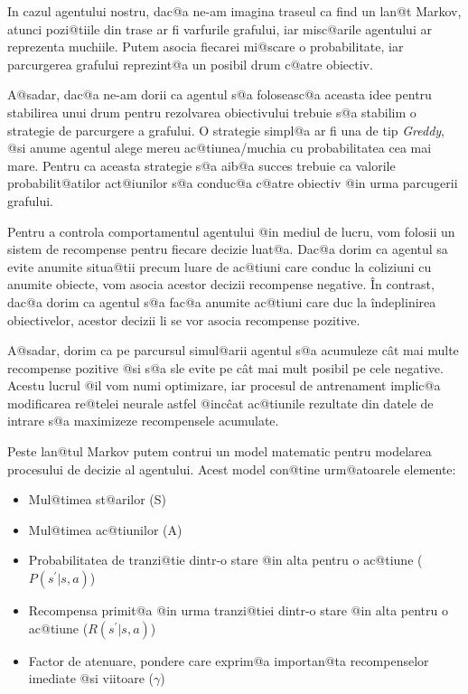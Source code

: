 In cazul agentului nostru, dac@a ne-am imagina traseul ca find un lan@t Markov, atunci pozi@tiile din trase ar fi varfurile grafului, iar misc@arile agentului ar reprezenta muchiile. Putem asocia fiecarei mi@scare o probabilitate, iar parcurgerea grafului reprezint@a un posibil drum c@atre obiectiv.

A@sadar, dac@a ne-am dorii ca agentul s@a foloseasc@a aceasta idee pentru stabilirea unui drum pentru rezolvarea obiectivului trebuie s@a stabilim o strategie de parcurgere a grafului.
O strategie simpl@a ar fi una de tip {\sl Greddy}, @si anume agentul alege mereu ac@tiunea/muchia cu probabilitatea cea mai mare. Pentru ca aceasta strategie s@a aib@a succes trebuie ca valorile probabilit@atilor act@iunilor s@a conduc@a c@atre obiectiv @in urma parcugerii grafului.

Pentru a controla comportamentul agentului @in mediul de lucru, vom folosii un sistem de recompense pentru fiecare decizie luat@a. Dac@a dorim ca agentul sa evite anumite situa@tii precum luare de ac@tiuni care conduc la coliziuni cu anumite obiecte, vom asocia acestor decizii recompense negative. \^In contrast, dac@a dorim ca agentul s@a fac@a anumite ac@tiuni care duc la \^indeplinirea obiectivelor, acestor decizii li se vor asocia recompense pozitive.

A@sadar, dorim ca pe parcursul simul@arii agentul s@a acumuleze c\^ at mai multe recompense pozitive @si s@a sle evite pe c\^ at mai mult posibil pe cele negative. Acestu lucrul @il vom numi optimizare, iar procesul de antrenament implic@a modificarea re@telei neurale astfel @inc\^ cat ac@tiunile rezultate din datele de intrare s@a maximizeze recompensele acumulate.

Peste lan@tul Markov putem contrui un model matematic pentru modelarea procesului de decizie al agentului. Acest model con@tine urm@atoarele elemente:

\begin{itemize}
	\item Mul@timea st@arilor (S)
	\item Mul@timea ac@tiunilor (A)
	\item Probabilitatea de tranzi@tie dintr-o stare @in alta pentru o ac@tiune ($P(s^{\prime}|s, a)$)
	\item Recompensa primit@a @in urma tranzi@tiei dintr-o stare @in alta pentru o ac@tiune ($R(s^{\prime}|s, a)$)
	\item Factor de atenuare, pondere care exprim@a importan@ta recompenselor imediate @si viitoare ($\gamma$)
\end{itemize}

